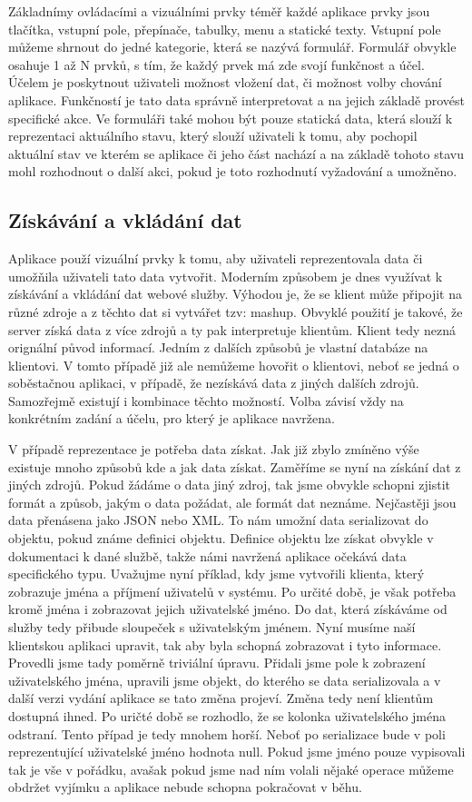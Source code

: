 Základnímy ovládacími a vizuálními prvky téměř každé aplikace prvky jsou tlačítka, vstupní pole, přepínače, tabulky, menu a statické texty. Vstupní pole můžeme shrnout do jedné kategorie, která se nazývá formulář. Formulář obvykle osahuje 1 až N prvků, s tím, že každý prvek má zde svojí funkčnost a účel. Účelem je poskytnout uživateli možnost vložení dat, či možnost volby chování aplikace. Funkčností je tato data správně interpretovat a na jejich základě provést specifické akce. Ve formuláři také mohou být pouze statická data, která slouží k reprezentaci aktuálního stavu, který slouží uživateli k tomu, aby pochopil aktuální stav ve kterém se aplikace či jeho část nachází a na základě tohoto stavu mohl rozhodnout o další akci, pokud je toto rozhodnutí vyžadování a umožněno.
\subsection{Získávání a vkládání dat}
Aplikace použí vizuální prvky k tomu, aby uživateli reprezentovala data či umožňila uživateli tato data vytvořit. Moderním způsobem je dnes využívat k získávání a vkládání dat webové služby. Výhodou je, že se klient může připojit na různé zdroje a z těchto dat si vytvářet tzv: mashup. Obvyklé použití je takové, že server získá data z více zdrojů a ty pak interpretuje klientům. Klient tedy nezná orignální původ informací. Jedním z dalších způsobů je vlastní databáze na klientovi. V tomto případě již ale nemůžeme hovořit o klientovi, neboť se jedná o soběstačnou aplikaci, v případě, že nezískává data z jiných dalších zdrojů. Samozřejmě existují i kombinace těchto možností. Volba závisí vždy na konkrétním zadání a účelu, pro který je aplikace navržena.

V případě reprezentace je potřeba data získat. Jak již zbylo zmíněno výše existuje mnoho způsobů kde a jak data získat. Zaměříme se nyní na získání dat z jiných zdrojů. Pokud žádáme o data jiný zdroj, tak jsme obvykle schopni zjistit formát a způsob, jakým o data požádat, ale formát dat neznáme. Nejčastěji jsou data přenásena jako JSON \cite{javaEE} nebo XML. To nám umožní data serializovat do objektu, pokud známe definici objektu. Definice objektu lze získat obvykle v dokumentaci k dané službě, takže námi navržená aplikace očekává data specifického typu. Uvažujme nyní příklad, kdy jsme vytvořili klienta, který zobrazuje jména a příjmení uživatelů v systému. Po určité době, je však potřeba kromě jména i zobrazovat jejich uživatelské jméno. Do dat, která získáváme od služby tedy přibude sloupeček s uživatelským jménem. Nyní musíme naší klientskou aplikaci upravit, tak aby byla schopná zobrazovat i tyto informace. Provedli jsme tady poměrně triviální úpravu. Přidali jsme pole k zobrazení uživatelského jména, upravili jsme objekt, do kterého se data serializovala a v další verzi vydání aplikace se tato změna projeví. Změna tedy není klientům dostupná ihned. Po uričté době se rozhodlo, že se kolonka uživatelského jména odstraní. Tento případ je tedy mnohem horší. Neboť po serializace bude v poli reprezentující uživatelské jméno hodnota null. Pokud jsme jméno pouze vypisovali tak je vše v pořádku, avašak pokud jsme nad ním volali nějaké operace můžeme obdržet vyjímku a aplikace nebude schopna pokračovat v běhu.

